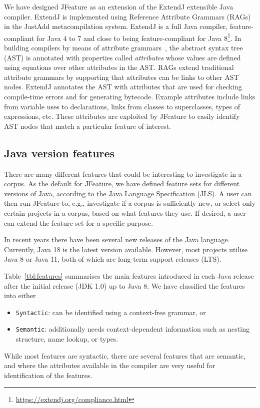 We have designed JFeature as an extension of the ExtendJ extensible Java compiler.
ExtendJ is implemented using Reference Attribute Grammars (RAGs)~\cite{hedin2000rags} in the JastAdd metacompilation system.
ExtendJ is a full Java compiler, feature-compliant for Java 4 to 7 and close to being feature-compliant for Java 8\footnote{\url{https://extendj.org/compliance.html}}.
In building compilers by means of attribute grammars~\cite{knuth1968semantics}, the abstract syntax tree (AST) is annotated with properties called \emph{attributes} whose values are defined using equations over other attributes in the AST.
RAGs extend traditional attribute grammars by supporting that attributes can be links to other AST nodes.
ExtendJ annotates the AST with attributes that are used for checking compile-time errors and for generating bytecode.
Example attributes include links from variable uses to declarations, links from classes to superclasses, types of expressions, etc.
These attributes are exploited by JFeature to easily identify AST nodes that match a particular feature of interest.

\subsection{Java version features}
There are many different features that could be interesting to investigate in a corpus.
As the default for JFeature, we have defined feature sets for different versions of Java, according to the Java Language Specification (JLS).
A user can then run JFeature to, e.g., investigate if a corpus is sufficiently new, or select only certain projects in a corpus, based on what features they use.
If desired, a user can extend the feature set for a specific purpose.

In recent years there have been several new releases of the Java language. Currently, Java 18 is the latest version available. However, most projects utilise Java 8 or Java 11, both of which are long-term support releases (LTS).

Table~\ref*{tbl:features} summarises the main features introduced in each Java
release after the initial release (JDK 1.0) up to Java 8.
We have classified the features into either
\begin{itemize}
    \item \texttt{Syntactic}: can be identified using a context-free grammar, or
    \item \texttt{Semantic}: additionally needs context-dependent information such as nesting structure, name lookup, or types.
\end{itemize}
While most features are syntactic, there are several features that are semantic, and where the attributes available in the compiler are very useful for identification of the features.

